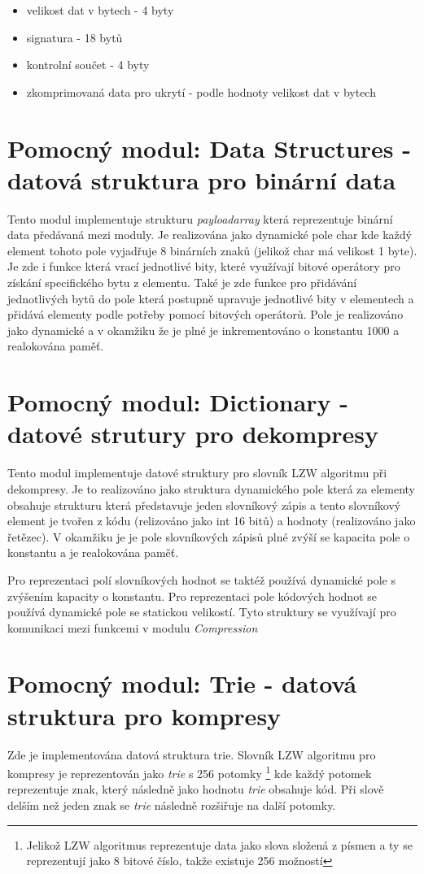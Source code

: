 \documentclass[12pt]{report}
\begin{document}
    \begin{itemize}
        \item velikost dat v bytech - 4 byty
        \item signatura - 18 bytů
        \item kontrolní součet - 4 byty
        \item zkomprimovaná data pro ukrytí - podle hodnoty velikost dat v bytech
    \end{itemize}


    \section{Pomocný modul: Data Structures - datová struktura pro binární data}
    Tento modul implementuje strukturu \textit{payloadarray} která reprezentuje binární data předávaná mezi moduly. Je realizována jako dynamické pole char kde každý element tohoto pole vyjadřuje 8 binárních znaků (jelikož char má velikost 1 byte). Je zde i funkce která vrací jednotlivé bity, které využívají bitové operátory pro získání specifického bytu z elementu. Také je zde funkce pro přidávání jednotlivých bytů do pole která postupně upravuje jednotlivé bity v elementech a přidává elementy podle potřeby pomocí bitových operátorů. Pole je realizováno jako dynamické a v okamžiku že je plné je inkrementováno o konstantu 1000 a realokována paměť.


    \section{Pomocný modul: Dictionary - datové strutury pro dekompresy}
    Tento modul implementuje datové struktury pro slovník LZW algoritmu při dekompresy.
    Je to realizováno jako struktura dynamického pole která za elementy obsahuje strukturu která představuje jeden slovníkový zápis a tento slovníkový element je tvořen z kódu (relizováno jako int 16 bitů) a hodnoty (realizováno jako řetězec). V okamžiku je je pole slovníkových zápisů plné zvýší se kapacita pole o konstantu a je realokována paměť.

    Pro reprezentaci polí slovníkových hodnot se taktéž používá dynamické pole s zvýšením kapacity o konstantu.
    Pro reprezentaci pole kódových hodnot se používá dynamické pole se statickou velikostí.
    Tyto struktury se využívají pro komunikaci mezi funkcemi v modulu \textit{Compression}

\section{Pomocný modul: Trie - datová struktura pro kompresy}
Zde je implementována datová struktura trie. 
Slovník LZW algoritmu pro kompresy je reprezentován jako \textit{trie} s 256 potomky \footnote{Jelikož LZW algoritmus reprezentuje data jako slova složená z písmen a ty se reprezentují jako 8 bitové číslo, takže existuje 256 možností} kde každý potomek reprezentuje znak, který následně jako hodnotu \textit{trie} obsahuje kód. Při slově delším než jeden znak se \textit{trie} následně rozšiřuje na další potomky.
\end{document}
